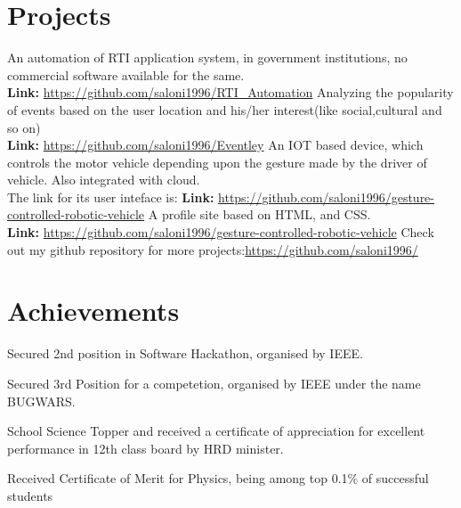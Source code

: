 \documentclass[]{hieudo-build}
\begin{document}
\begin{minipage}[t]{0.69\textwidth} 

\section{Projects}

\descript{}
An automation of RTI application system, in government institutions, no commercial software available for the same. \\
\textbf{Link:} \url{https://github.com/saloni1996/RTI_Automation}
\sectionsep
{}
\descript{}
Analyzing the popularity of events based on the user location and his/her interest(like social,cultural and so on)\\
\textbf{Link:} \url{https://github.com/saloni1996/Eventley}
\sectionsep
{}
\descript{}
An IOT based device, which controls the motor vehicle depending upon the gesture made by the driver of vehicle. Also integrated with cloud.\\
The link for its user inteface is: \textbf{Link:} \url{https://github.com/saloni1996/gesture-controlled-robotic-vehicle}
\sectionsep 
{}
\descript{}
A profile site based on HTML, and CSS. \\
 \textbf{Link:} \url{https://github.com/saloni1996/gesture-controlled-robotic-vehicle}
\sectionsep
{}
\descript{}
Check out my github repository for more projects:\url{https://github.com/saloni1996/}
\sectionsep

\section{Achievements}

\vspace{0.5em} 
\begin{tightemize}

\item Secured 2nd position in Software Hackathon, organised by IEEE.
\item Secured 3rd Position for a competetion, organised by IEEE under the name BUGWARS.
\item School Science Topper and received a certificate of appreciation for excellent performance in 12th class board by HRD minister.
\item Received Certificate of Merit for Physics, being among top 0.1\% of successful students
\end{tightemize}
\sectionsep



\end{minipage}
\end{document}
